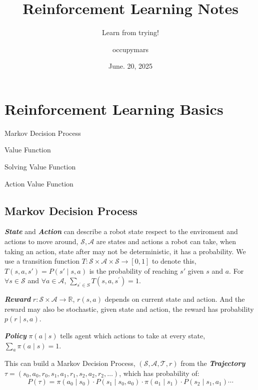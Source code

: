 \documentclass[10pt]{elegantbook}
\title{Reinforcement Learning Notes}
\subtitle{Learn from trying!}
\author{occupymars}
\date{June. 20, 2025}
\newcommand{\mydefination}[1]{\textbf{\textit{\textcolor{structurecolor}{#1}}}}
\begin{document}
\maketitle

\frontmatter
\tableofcontents

\mainmatter

\chapter{Reinforcement Learning Basics}

\begin{introduction}
    \item Markov Decision Process
    \item Value Function
    \item Solving Value Function
    \item Action Value Function
\end{introduction}
    
\section{Markov Decision Process}
\mydefination{State} and \mydefination{Action} can describe a robot state respect to the enviroment and actions to move around, 
$\mathcal S, \mathcal A$ are states and actions a robot can take, when taking an action, state after may not
be deterministic, it has a probability. We use a transition function $T: \mathcal S \times \mathcal A \times 
\mathcal S \rightarrow [0, 1]$ to denote this, $T(s, a, s') = P(s' \mid s,a)$ is the probability of reaching $s'$
given $s$ and $a$. For $\forall s \in \mathcal S$ and $\forall a \in \mathcal A$, $\sum_{s^{'}\in S}T(s, a, s^{'}) = 1$. 

\mydefination{Reward} $r:\mathcal S \times \mathcal A \rightarrow \mathbb R$, $r(s,a)$ depends on current state and action. And the reward
may also be stochastic, given state and action, the reward has probability $p(r \mid s, a)$.

\mydefination{Policy} $\pi(a \mid s)$ tells agent which actions to take at every state, $\sum_a \pi(a \mid s) = 1$.

This can build a Markov Decision Process, $(\mathcal S, \mathcal A, \mathcal T, r)$ from the \mydefination{Trajectory} 
$\tau = (s_0, a_0, r_0, s_1, a_1, r_1, s_2, a_2, r_2, \ldots)$, which has probability of:
\[ P(\tau) = \pi(a_0\mid s_0) \cdot P(s_1 \mid s_0, a_0) \cdot \pi(a_1\mid s_1) \cdot P(s_2 \mid s_1, a_1) \cdots \] 
\end{document}
